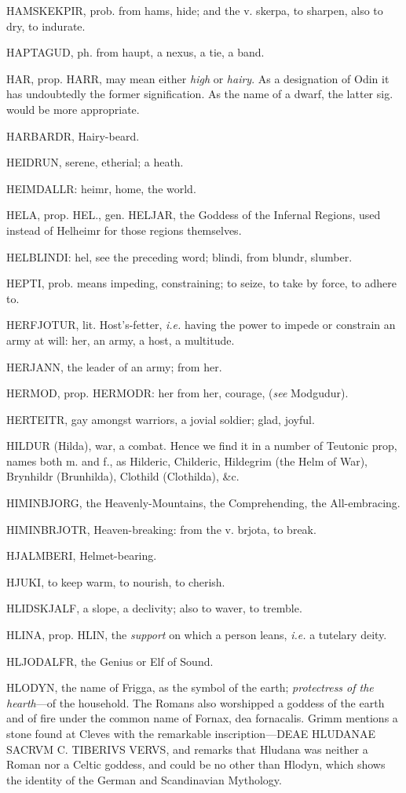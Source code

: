 HAMSKEKPIR, prob. from hams, hide; and the v. skerpa, to sharpen, also
to dry, to indurate.

HAPTAGUD, ph. from haupt, a nexus, a tie, a band.

HAR, prop. HARR, may mean either \emph{high} or \emph{hairy}. As a designation
of Odin it has undoubtedly the former signification. As the name of a
dwarf, the latter sig. would be more appropriate.

HARBARDR, Hairy-beard.

HEIDRUN, serene, etherial; a heath.

HEIMDALLR: heimr, home, the world.

HELA, prop. HEL., gen. HELJAR, the Goddess of the Infernal Regions,
used instead of Helheimr for those regions themselves.

HELBLINDI: hel, see the preceding word; blindi, from blundr, slumber.

HEPTI, prob. means impeding, constraining; to seize, to take by force,
to adhere to.

HERFJOTUR, lit. Host's-fetter, \emph{i.e.} having the power to impede or
constrain an army at will: her, an army, a host, a multitude.

HERJANN, the leader of an army; from her.

HERMOD, prop. HERMODR: her from her, courage, (\emph{see} Modgudur).

HERTEITR, gay amongst warriors, a jovial soldier; glad, joyful.

HILDUR (Hilda), war, a combat. Hence we find it in a number of
Teutonic prop, names both m. and f., as Hilderic, Childeric, Hildegrim
(the Helm of War), Brynhildr (Brunhilda), Clothild (Clothilda), \&c.

HIMINBJORG, the Heavenly-Mountains, the Comprehending, the
All-embracing.

HIMINBRJOTR, Heaven-breaking: from the v. brjota, to break.

HJALMBERI, Helmet-bearing.

HJUKI, to keep warm, to nourish, to cherish.

HLIDSKJALF, a slope, a declivity; also to waver, to tremble.

HLINA, prop. HLIN, the \emph{support} on which a person leans, \emph{i.e.} a
tutelary deity.

HLJODALFR, the Genius or Elf of Sound.

HLODYN, the name of Frigga, as the symbol of the earth; \emph{protectress
of the hearth}—of the household. The Romans also worshipped a goddess
of the earth and of fire under the common name of Fornax, dea
fornacalis. Grimm mentions a stone found at Cleves with the remarkable
inscription—DEAE HLUDANAE SACRVM C. TIBERIVS VERVS, and remarks that
Hludana was neither a Roman nor a Celtic goddess, and could be no
other than Hlodyn, which shows the identity of the German and
Scandinavian Mythology.

